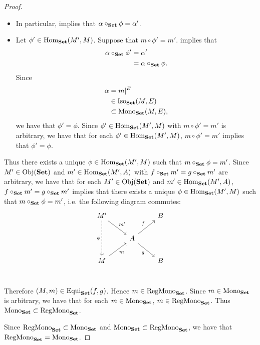 \documentclass{book}
\begin{document}
\begin{proof}
\begin{itemize}
\begin{enumerate}
\begin{itemize}
\begin{itemize}
\begin{align*}
							& = m'.
						\end{align*}
						Uniqueness of $\al'$ implies that $\al \circ_{\bSet} \phi_0 = \al'$. Since $\phi_0 \in \Hom_{\bSet}(M', M)$ such that $m \circ \phi_0 = m'$ is arbitrary, we have that for each $\phi_0 \in \Hom_{\bSet}(M', M)$, $m \circ \phi_0 = m'$ implies that $\al \circ_{\bSet} \phi_0 = \al'$.
						\item In particular,  implies that $\alpha \circ_{\text{\textbf{Set}}} \phi = \alpha'$.
						\item Let $\phi' \in \operatorname{Hom}_{\text{\textbf{Set}}}(M', M)$. Suppose that $m \circ \phi' = m'$.  implies that
						\begin{align*}
							\alpha \circ_{\text{\textbf{Set}}} \phi' 
							& = \alpha' \\
							& = \alpha \circ_{\text{\textbf{Set}}} \phi.
						\end{align*}
						Since 
						\begin{align*}
							\alpha
							& = m|^E \\
							& \in \operatorname{Iso}_{\text{\textbf{Set}}}(M,E) \\
							& \subset \operatorname{Mono}_{\text{\textbf{Set}}}(M, E),
						\end{align*}
						we have that $\phi' = \phi$. Since $\phi' \in \operatorname{Hom}_{\text{\textbf{Set}}}(M', M)$ with $m \circ \phi' = m'$ is arbitrary, we have that for each $\phi' \in \operatorname{Hom}_{\text{\textbf{Set}}}(M', M)$, $m \circ \phi' = m'$ implies that $\phi' = \phi$.
					\end{itemize}
				\end{itemize}
				Thus there exists a unique $\phi \in \operatorname{Hom}_{\text{\textbf{Set}}}(M', M)$ such that $m \circ_{\text{\textbf{Set}}} \phi = m'$. Since $M' \in \operatorname{Obj}(\text{\textbf{Set}})$ and $m' \in \operatorname{Hom}_{\text{\textbf{Set}}}(M', A)$ with $f \circ_{\text{\textbf{Set}}} m' = g \circ_{\text{\textbf{Set}}} m'$ are arbitrary, we have that for each $M' \in \operatorname{Obj}(\text{\textbf{Set}})$ and $m' \in \operatorname{Hom}_{\text{\textbf{Set}}}(M', A)$, $f \circ_{\text{\textbf{Set}}} m' = g \circ_{\text{\textbf{Set}}} m'$ implies that there exists a unique $\phi \in \operatorname{Hom}_{\text{\textbf{Set}}}(M', M)$ such that $m \circ_{\text{\textbf{Set}}} \phi = m'$, i.e. the following diagram commutes:
				\[ 
				\begin{tikzcd}[baseline= 7]
					M' \arrow[dr, "m'"] \arrow[dd, "\phi"', dashed]&     & B \\
					& A \arrow[ur, "f"] \arrow[dr, "g"'] &   \\
					M \arrow[ur, "m"'] &                                  & B \\
				\end{tikzcd}
				\]
			\end{enumerate}
			Therefore $(M, m) \in \operatorname{Equi}_{\text{\textbf{Set}}}(f,g)$. Hence $m \in \operatorname{RegMono}_{\text{\textbf{Set}}}$. Since $m \in \operatorname{Mono}_{\text{\textbf{Set}}}$ is arbitrary, we have that for each $m \in \operatorname{Mono}_{\text{\textbf{Set}}}$, $m \in \operatorname{RegMono}_{\text{\textbf{Set}}}$. Thus $\operatorname{Mono}_{\text{\textbf{Set}}} \subset \operatorname{RegMono}_{\text{\textbf{Set}}}$. 
		\end{itemize}
		Since $\operatorname{RegMono}_{\text{\textbf{Set}}} \subset \operatorname{Mono}_{\text{\textbf{Set}}}$ and $\operatorname{Mono}_{\text{\textbf{Set}}} \subset \operatorname{RegMono}_{\text{\textbf{Set}}}$, we have that $\operatorname{RegMono}_{\text{\textbf{Set}}} = \operatorname{Mono}_{\text{\textbf{Set}}}$.
	\end{proof}
	
\end{document}
